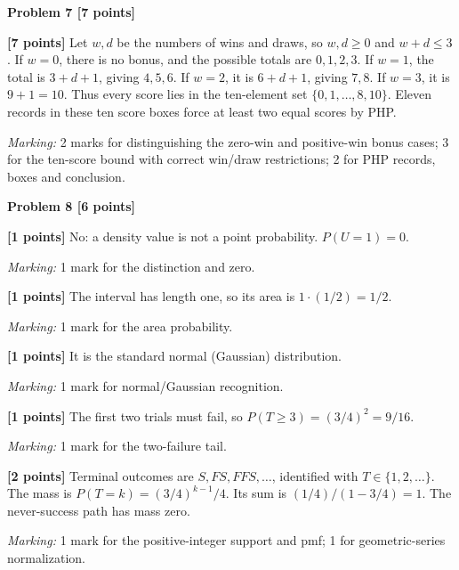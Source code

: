 \documentclass[12pt,letterpaper]{article}
\newcommand{\problemheading}[2][5\baselineskip]{\Needspace{#1}\par\noindent\hspace*{-0.625in}\textbf{#2}\par\nobreak\vspace{0.3em}}
\begin{document}
\vspace{0.65em}
\problemheading[\dimexpr 3\baselineskip+4\baselineskip\relax]{Problem 7 [7 points]}
\begin{description}[font=\normalfont,leftmargin=1.2em,labelsep=0.4em]
\item[] \textbf{[7 points]} Let $w,d$ be the numbers of wins and draws, so $w,d\ge0$ and $w+d\le3$. If $w=0$, there is no bonus, and the possible totals are $0,1,2,3$. If $w=1$, the total is $3+d+1$, giving $4,5,6$. If $w=2$, it is $6+d+1$, giving $7,8$. If $w=3$, it is $9+1=10$. Thus every score lies in the ten-element set $\{0,1,\ldots,8,10\}$. Eleven records in these ten score boxes force at least two equal scores by PHP.
\par\textit{Marking:} 2 marks for distinguishing the zero-win and positive-win bonus cases; 3 for the ten-score bound with correct win/draw restrictions; 2 for PHP records, boxes and conclusion.
\end{description}
\vspace{0.65em}
\problemheading[\dimexpr 3\baselineskip+4\baselineskip\relax]{Problem 8 [6 points]}
\begin{description}[font=\normalfont,leftmargin=1.2em,labelsep=0.4em]
\item[(a)] \textbf{[1 points]} No: a density value is not a point probability. $P(U=1)=0$.
\par\textit{Marking:} 1 mark for the distinction and zero.
\item[(b)] \textbf{[1 points]} The interval has length one, so its area is $1\cdot(1/2)=1/2$.
\par\textit{Marking:} 1 mark for the area probability.
\item[(c)] \textbf{[1 points]} It is the standard normal (Gaussian) distribution.
\par\textit{Marking:} 1 mark for normal/Gaussian recognition.
\item[(d)] \textbf{[1 points]} The first two trials must fail, so $P(T\ge3)=(3/4)^2=9/16$.
\par\textit{Marking:} 1 mark for the two-failure tail.
\item[(e)] \textbf{[2 points]} Terminal outcomes are $S,F S,F F S,\ldots$, identified with $T\in\{1,2,\ldots\}$. The mass is $P(T=k)=(3/4)^{k-1}/4$. Its sum is $(1/4)/(1-3/4)=1$. The never-success path has mass zero.
\par\textit{Marking:} 1 mark for the positive-integer support and pmf; 1 for geometric-series normalization.
\end{description}
\end{document}

